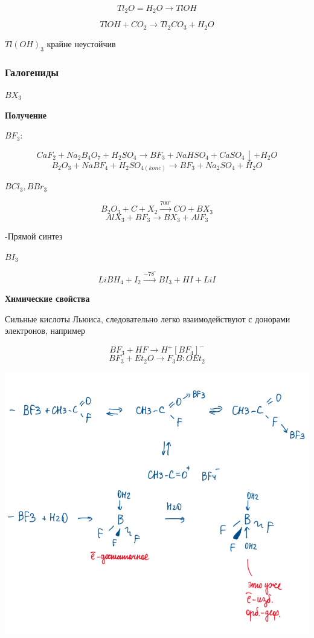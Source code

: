 \documentclass[14pt,a4paper]{scrartcl}
\begin{document}
$$Tl_2O = H_2O \rightarrow TlOH$$

$$TlOH + CO_2 \rightarrow Tl_2CO_3 + H_2O$$

$Tl(OH)_3$ крайне неустойчив

\subsubsection{Галогениды}

$BX_3$

\textbf{Получение}

$BF_3$:

$$CaF_2 + Na_2B_4O_7 + H_2SO_4 \rightarrow BF_3 + NaHSO_4 + CaSO_4\downarrow + H_2O$$
$$B_2O_3 + NaBF_4 + H_2SO_{4(konc)} \rightarrow BF_3 + Na_2SO_4 + H_2O$$

$BCl_3, BBr_3$

$$B_2O_3 + C + X_2 \xrightarrow{700^{\circ}} CO + BX_3$$
$$AlX_3 + BF_3 \rightarrow BX_3 + AlF_3$$

-Прямой синтез

$BI_3$

$$LiBH_4 + I_2 \xrightarrow{-78^{\circ}} BI_3 + HI + LiI$$

\textbf{Химические свойства}

Сильные кислоты Льюиса, следовательно легко взаимодействуют с донорами электронов, например

$$BF_3 + HF \rightarrow H^+[BF_4]^-$$
$$BF_3 + Et_2O \rightarrow F_3B:OEt_2$$

\includegraphics{11v8.png}
\end{document}

